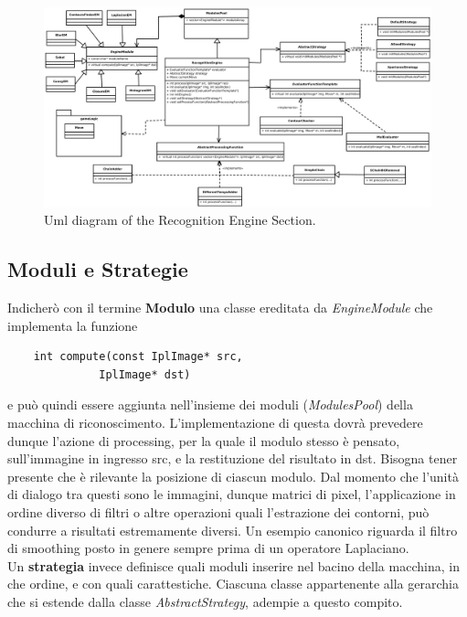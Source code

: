 \documentclass[a4paper,10pt, twocolumn]{article}
\begin{document}
  \begin{figure}[tp]
     \centering
    \includegraphics[angle=90, scale=0.5]{UmlDiagrams/recognitionEngine.pdf}
    \caption{Uml diagram of the Recognition Engine Section.}
    \label{recognitionEngineDiagram}
  \end{figure}

  \subsection{Moduli e Strategie}
  Indicher\`{o}
  con il termine \textbf{Modulo} una classe ereditata da \textit{EngineModule} 
  che implementa la funzione
  
  \begin{center}
    \begin{verbatim}
    int compute(const IplImage* src, 
		      IplImage* dst)
    \end{verbatim}
  \end{center}
   e pu\`{o} quindi essere aggiunta nell'insieme dei moduli (\textit{ModulesPool})
  della macchina di riconoscimento.
  L'implementazione di questa dovr\`{a} prevedere dunque l'azione di processing, 
  per la quale il modulo stesso 
  \`{e} pensato, sull'immagine in ingresso src, e la restituzione del risultato in dst.
  Bisogna tener presente che \`{e} rilevante la posizione di ciascun modulo.
  Dal momento che l'unit\`{a} di dialogo tra questi sono le immagini, dunque matrici
  di pixel, l'applicazione in ordine diverso di filtri o altre operazioni quali l'estrazione
  dei contorni, pu\`{o} condurre a risultati estremamente diversi. Un esempio canonico
  riguarda il filtro di smoothing posto in genere sempre prima di un operatore Laplaciano.\\
  Un \textbf{strategia} invece definisce quali moduli inserire nel bacino della macchina,
  in che ordine, e con quali carattestiche. Ciascuna classe appartenente alla gerarchia
  che si estende dalla classe \textit{AbstractStrategy}, adempie a questo compito. 
  
\end{document}
